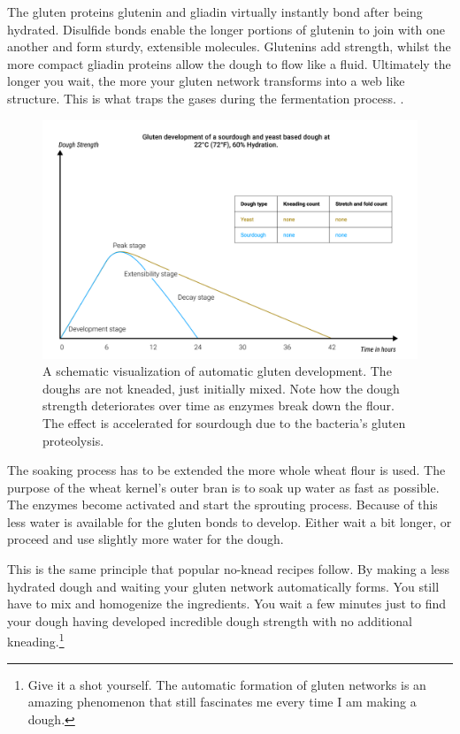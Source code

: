 The gluten proteins glutenin and gliadin virtually instantly bond after being
hydrated. Disulfide bonds enable the longer portions of
glutenin to join with one another and form sturdy, extensible molecules.
Glutenins add strength, whilst the more compact gliadin proteins allow
the dough to flow like a fluid. Ultimately the longer you wait, the more
your gluten network transforms into a web like structure. This is what
traps the gases during the fermentation process. \cite{how+does+gluten+work}.

\begin{figure}[!htb]
  \includegraphics[width=\textwidth]{dough-strength-sourdough-yeast}
  \caption{A schematic visualization of
  automatic gluten development. The doughs are not kneaded, just initially
  mixed. Note how the dough strength
  deteriorates over time as enzymes break down the flour. The effect
  is accelerated for sourdough due to the bacteria's gluten proteolysis.
  }
  \label{fig:wheat-yeast-sourdough-degradation}
\end{figure}

The soaking process has to be extended the more whole wheat flour is used.
The purpose of the wheat kernel's outer bran is to soak up water as fast
as possible. The enzymes become activated and start the sprouting process.
Because of this less water is available for the gluten bonds to develop.
Either wait a bit longer, or proceed and use slightly more water for
the dough.

This is the same principle that popular no-knead recipes follow. By making a less
hydrated dough and waiting your gluten network automatically forms. You still
have to mix and homogenize the ingredients. You wait a few minutes just to
find your dough having developed incredible dough strength with no additional
kneading.\footnote{Give it a shot yourself. The automatic formation of gluten
networks is an amazing phenomenon that still fascinates me every time I am
making a dough.}

